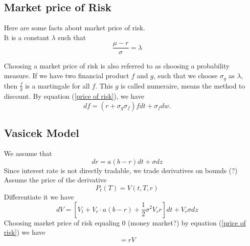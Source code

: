 \documentclass[12pt]{amsart}
\theoremstyle{definition}
\theoremstyle{remark}
\begin{document}
\subsection{Market price of Risk}
Here are some facts about market price of risk.\\
It is a constant $\lambda$ such that 
\begin{equation}\label{price of risk}
\frac{\mu -r}{\sigma} = \lambda
\end{equation}

Choosing a market price of risk is also referred to as choosing a probability measure.
If we have two financial product $f$ and $g$, such that we choose $\sigma _g$ as $\lambda$, then 
$\frac{f}{g}$ is a martingale for all $f$. This $g$ is called numeraire, means the method to discount.
By equation (\ref{price of risk}), we have 
\begin{equation*}
df = (r+\sigma _g \sigma _f)fdt+\sigma_f dw.
\end{equation*}



\subsection{Vasicek Model}
We assume that 
\begin{equation*}
dr = a(b-r)dt + \sigma dz
\end{equation*}
Since interest rate is not directly tradable, we trade derivatives on bounds (?) 
Assume the price of the derivative 
\begin{equation*}
P_t(T) = V(t, T, r)
\end{equation*}
Differentiate it we have 
\begin{equation*}
dV = [ V_t +V_r\cdot a(b-r) +\frac{1}{2}\sigma ^2 V_rr ]dt + V_r \sigma dz
\end{equation*}
Choosing market price of risk equaling 0 (money market?) by equation (\ref{price of risk}) we have 
\begin{equation*}
[ V_t +V_r\cdot a(b-r) +\frac{1}{2}\sigma ^2 V_rr ] = rV
\end{equation*}


{}

\end{document}
